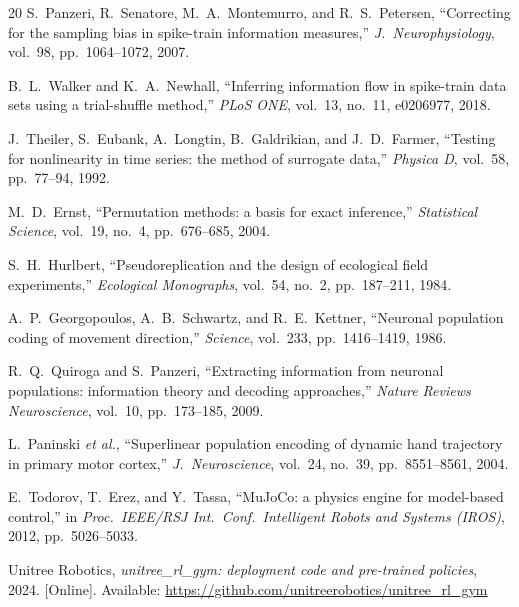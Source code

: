 \begin{thebibliography}{20}
S.~Panzeri, R.~Senatore, M.~A.~Montemurro, and R.~S.~Petersen, ``Correcting for
the sampling bias in spike-train information measures,''
\emph{J.\ Neurophysiology}, vol.~98, pp.~1064--1072, 2007.

B.~L.~Walker and K.~A.~Newhall, ``Inferring information flow in spike-train
data sets using a trial-shuffle method,'' \emph{PLoS ONE}, vol.~13, no.~11,
e0206977, 2018.

J.~Theiler, S.~Eubank, A.~Longtin, B.~Galdrikian, and J.~D.~Farmer, ``Testing
for nonlinearity in time series: the method of surrogate data,'' \emph{Physica
D}, vol.~58, pp.~77--94, 1992.

M.~D.~Ernst, ``Permutation methods: a basis for exact inference,''
\emph{Statistical Science}, vol.~19, no.~4, pp.~676--685, 2004.

S.~H.~Hurlbert, ``Pseudoreplication and the design of ecological field
experiments,'' \emph{Ecological Monographs}, vol.~54, no.~2, pp.~187--211,
1984.

A.~P.~Georgopoulos, A.~B.~Schwartz, and R.~E.~Kettner, ``Neuronal population
coding of movement direction,'' \emph{Science}, vol.~233, pp.~1416--1419, 1986.

R.~Q.~Quiroga and S.~Panzeri, ``Extracting information from neuronal
populations: information theory and decoding approaches,'' \emph{Nature Reviews
Neuroscience}, vol.~10, pp.~173--185, 2009.

L.~Paninski \emph{et al.}, ``Superlinear population encoding of dynamic hand
trajectory in primary motor cortex,'' \emph{J.\ Neuroscience}, vol.~24,
no.~39, pp.~8551--8561, 2004.

E.~Todorov, T.~Erez, and Y.~Tassa, ``MuJoCo: a physics engine for model-based
control,'' in \emph{Proc.\ IEEE/RSJ Int.\ Conf.\ Intelligent Robots and Systems
(IROS)}, 2012, pp.~5026--5033.

Unitree Robotics, \emph{unitree\_rl\_gym: deployment code and pre-trained
policies}, 2024. [Online]. Available:
\url{https://github.com/unitreerobotics/unitree_rl_gym}

\end{thebibliography}


